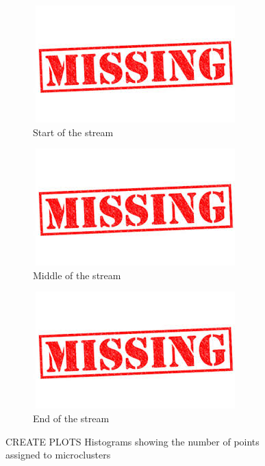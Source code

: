 \begin{figure}[h!]
  \centering
  \begin{subfigure}{0.3\textwidth}
    \centering
    \includegraphics[width = \textwidth]{missing.png}
    \caption{Start of the stream}
  \label{fig:hist1}
  \end{subfigure}
  \begin{subfigure}{0.3\textwidth}
    \centering
    \includegraphics[width = \textwidth]{missing}
  \caption{Middle of the stream}
  \label{fig:hist2}
  \end{subfigure}
\begin{subfigure}{0.3\textwidth}
    \centering
    \includegraphics[width = \textwidth]{missing}
  \caption{End of the stream}
  \label{fig:hist3}
  \end{subfigure}
    \caption{CREATE PLOTS Histograms showing the number of points assigned to microclusters}
  \label{fig:microHist}
\end{figure}


